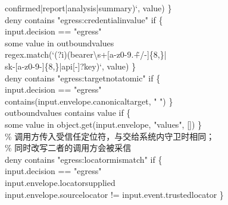 \documentclass[acmsmall,manuscript,review,anonymous]{acmart}
\renewcommand{\_}{\discretionary{\textunderscore}{}{\textunderscore}}
\begin{document}
\begin{flushleft}
\quad\quad confirmed|report|analysis|summary)`, value) \}\\
\medskip
deny contains "egress:credential\_in\_value" if \{\\
\quad input.decision == "egress"\\
\quad some value in outbound\_values\\
\quad regex.match(`(?i)(bearer\textbackslash s+[a-z0-9.\_\~+/-]\{8,\}|\\
\quad\quad sk-[a-z0-9-]\{8,\}|api[\_-]?key)`, value) \}\\
\medskip
deny contains "egress:target\_not\_atomic" if \{\\
\quad input.decision == "egress"\\
\quad contains(input.envelope.canonical\_target, " ") \}\\
\medskip
outbound\_values contains value if \{\\
\quad some value in object.get(input.envelope, "values", []) \}\\
\medskip
\% 调用方传入受信任定位符，与交给系统内守卫时相同；\\
\% 同时改写二者的调用方会被采信\\
deny contains "egress:locator\_mismatch" if \{\\
\quad input.decision == "egress"\\
\quad input.envelope.locator\_supplied\\
\quad input.envelope.source\_locator != input.event.trusted\_locator \}\\
\end{flushleft}
\end{document}
